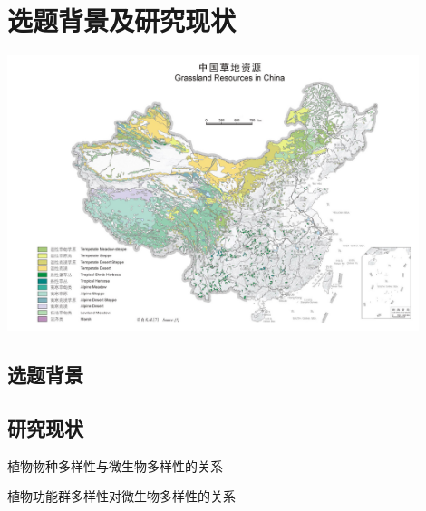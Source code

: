 \section{选题背景及研究现状}

\begin{frame}{\insertsection}
\begin{center}
	\includegraphics[width = 0.9\textwidth]{./中国草地资源.jpg}
\end{center}
\end{frame}

\subsection{选题背景}


\subsection{研究现状}

\begin{frame}{\insertsection}{\insertsubsection}
植物物种多样性与微生物多样性的关系	
\end{frame}

\begin{frame}{\insertsection}{\insertsubsection}
植物功能群多样性对微生物多样性的关系	
\end{frame}
